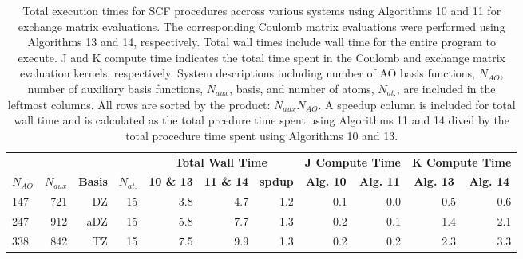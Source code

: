 \begingroup
\renewcommand{\arraystretch}{0.7}
\begin{table}[H]
\footnotesize
\centering
\renewcommand{\baselinestretch}{1}
\caption{Total execution times for SCF procedures accross various systems using Algorithms 10 and 11 for exchange matrix evaluations. 
The corresponding Coulomb matrix evaluations were performed using Algorithms 13 and 14, respectively. Total wall times include 
wall time for the entire program to execute. J and K compute time indicates the total time spent in the Coulomb and exchange matrix
evaluation kernels, respectively. System descriptions including number of AO basis functions, $N_{AO}$, number of auxiliary basis functions,
$N_{aux}$, basis, and number of atoms, $N_{at.}$, are included in the leftmost columns. All rows are sorted by the product: $N_{aux}N_{AO}$.
A speedup column is included for total wall time and is calculated as the total prcedure time spent using Algorithms 11 and 14 dived by 
the total procedure time spent using Algorithms 10 and 13.
\label{tbl:practical_speedups}}
\begin{tabular}{lrrrrrrrrrr}
  \multicolumn{1}{c}{\textbf{}} 
& \multicolumn{1}{c}{\textbf{}} 
& \multicolumn{1}{c}{\textbf{}} 
& \multicolumn{1}{c}{\textbf{}} 
& \multicolumn{3}{c}{\textbf{Total Wall Time}}  
& \multicolumn{2}{c}{\textbf{J Compute Time}}  
& \multicolumn{2}{c}{\textbf{K Compute Time}} \\ 
\cline{5-7}
\cline{8-9}
\cline{10-11}
  \multicolumn{1}{c}{\textbf{$N_{AO}$}} 
& \multicolumn{1}{c}{\textbf{$N_{aux}$}} 
& \multicolumn{1}{c}{\textbf{Basis}} 
& \multicolumn{1}{c}{\textbf{$N_{at.}$}} 
& \multicolumn{1}{c}{\textbf{10 \& 13}} 
& \multicolumn{1}{c}{\textbf{11 \& 14}} 
& \multicolumn{1}{c}{\textbf{spdup}} 
& \multicolumn{1}{c}{\textbf{Alg. 10}} 
& \multicolumn{1}{c}{\textbf{Alg. 11}} 
& \multicolumn{1}{c}{\textbf{Alg. 13}} 
& \multicolumn{1}{c}{\textbf{Alg. 14}} \\ 
\hline
 147&  721&    DZ&    15&                 3.8 &                4.7&     1.2 &                0.1 &                0.0&                 0.5&                 0.6\\
 247&  912&   aDZ&    15&                 5.8 &                7.7&     1.3 &                0.2 &                0.1&                 1.4&                 2.1\\
 338&  842&    TZ&    15&                 7.5 &                9.9&     1.3 &                0.2 &                0.2&                 2.3&                 3.3\\

\end{tabular}
\end{table}
